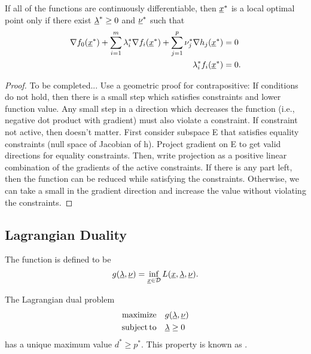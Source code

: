 \begin{theorem}
If all of the functions are continuously differentiable, then $\underline{x}^*$ is a local optimal point only if there exist $\underline{\lambda}^* \geq 0$ and $\underline{\nu}^*$ such that
\begin{align*}
\nabla f_0 (\underline{x}^*) + \sum_{i=1}^m \lambda_i^* \nabla f_i (\underline{x}^*) + \sum_{j=1}^p \nu_j^* \nabla h_j (\underline{x}^*) &= 0 \\
\lambda_i^* f_i(\underline{x}^*) &= 0 .
\end{align*}
\end{theorem}
\begin{proof}
To be completed...
Use a geometric proof for contrapositive: If conditions do not hold, then there is a small step which satisfies constraints and lower function value.
Any small step in a direction which decreases the function (i.e., negative dot product with gradient) must also violate a constraint.
If constraint not active, then doesn't matter.
First consider subspace E that satisfies equality constraints (null space of Jacobian of h).
Project gradient on E to get valid directions for equality constraints.
Then, write projection as a positive linear combination of the gradients of the active constraints.
If there is any part left, then the function can be reduced while satisfying the constraints.
Otherwise, we can take a small in the gradient direction and increase the value without violating the constraints.
\end{proof}

\subsection{Lagrangian Duality}

\begin{definition}
The  function is defined to be
\[ g(\underline{\lambda},\underline{\nu}) = \inf_{\underline{x}\in \mathcal{D}} L(\underline{x},\underline{\lambda},\underline{\nu}). \]
\end{definition}


\begin{lemma}
The Lagrangian dual problem
\begin{align*}
\mathrm{maximize} \quad & g(\underline{\lambda},\underline{\nu}) \\
\mathrm{subject\,to} \quad & \underline{\lambda} \geq 0
\end{align*}
has a unique maximum value $d^* \geq p^*$.
This property is known as .
\end{lemma}

